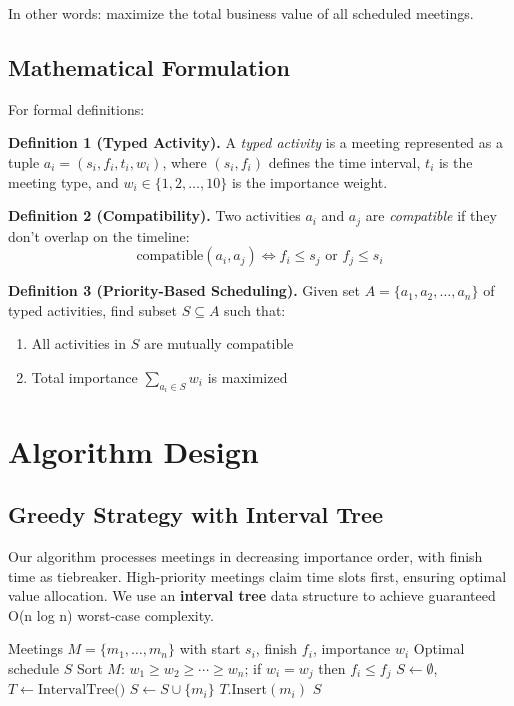 \documentclass[conference]{IEEEtran}
\begin{document}
In other words: maximize the total business value of all scheduled meetings.

\subsection{Mathematical Formulation}

For formal definitions:

\textbf{Definition 1 (Typed Activity).} A \textit{typed activity} is a meeting represented as a tuple $a_i = (s_i, f_i, t_i, w_i)$, where $(s_i, f_i)$ defines the time interval, $t_i$ is the meeting type, and $w_i \in \{1, 2, \ldots, 10\}$ is the importance weight.

\textbf{Definition 2 (Compatibility).} Two activities $a_i$ and $a_j$ are \textit{compatible} if they don't overlap on the timeline:
\begin{equation}
\text{compatible}(a_i, a_j) \iff f_i \leq s_j \text{ or } f_j \leq s_i
\end{equation}

\textbf{Definition 3 (Priority-Based Scheduling).} Given set $A = \{a_1, a_2, \ldots, a_n\}$ of typed activities, find subset $S \subseteq A$ such that:
\begin{enumerate}
    \item All activities in $S$ are mutually compatible
    \item Total importance $\sum_{a_i \in S} w_i$ is maximized
\end{enumerate}

\section{Algorithm Design}

\subsection{Greedy Strategy with Interval Tree}

Our algorithm processes meetings in decreasing importance order, with finish time as tiebreaker. High-priority meetings claim time slots first, ensuring optimal value allocation. We use an \textbf{interval tree} data structure to achieve guaranteed O(n log n) worst-case complexity.

\begin{algorithm}
\caption{Priority-Based Meeting Scheduler with Interval Tree}
\label{alg:priority_scheduling}
\begin{algorithmic}[1]
\REQUIRE Meetings $M = \{m_1, \ldots, m_n\}$ with start $s_i$, finish $f_i$, importance $w_i$
\ENSURE Optimal schedule $S$
\STATE Sort $M$: $w_1 \geq w_2 \geq \cdots \geq w_n$; if $w_i = w_j$ then $f_i \leq f_j$
\STATE $S \leftarrow \emptyset$, $T \leftarrow \text{IntervalTree()}$
\STATE $S \leftarrow S \cup \{m_i\}$
\STATE $T.\text{Insert}(m_i)$
\ENDIF
\ENDFOR
\RETURN $S$
\end{algorithmic}
\end{algorithm}
\end{document}
